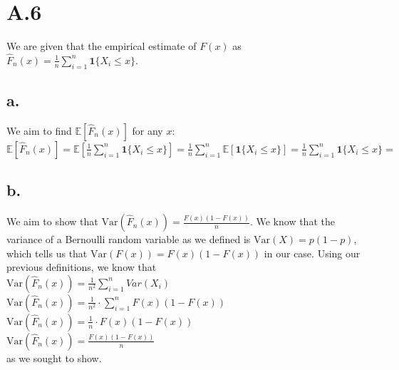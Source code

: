 \documentclass{article}
\newcommand{\1}{\mathbf{1}}
\newcommand{\E}{\mathbb{E}}
\begin{document}
\section*{A.6}
{\Large 

We are given that the empirical estimate of $F(x)$ as $\widehat{F}_n(x) = \frac{1}{n} \sum_{i=1}^n \1\{X_i \leq x\}$.

\subsection*{a.}
We aim to find $\E[ \widehat{F}_n(x) ]$ for any $x$: \\
$\E[ \widehat{F}_n(x) ] = \E[\frac{1}{n} \sum_{i=1}^n \1\{X_i \leq x\}] = \frac{1}{n} \sum_{i=1}^n \E[\1\{X_i \leq x\}] = \frac{1}{n} \sum_{i=1}^n \1\{X_i \leq x\} = $ 

\subsection*{b.}
We aim to show that $\textrm{Var}(\widehat{F}_n(x)) = \frac{F(x)(1-F(x))}{n}$. We know that the variance of a Bernoulli random variable as we defined is $\text{Var}(X) = p(1-p)$, which tells us that $\text{Var}(F(x)) = F(x)(1-F(x))$ in our case. Using our previous definitions, we know that \\
$\textrm{Var}(\widehat{F}_n(x)) = \frac{1}{n^2} \sum_{i = 1}^{n} Var(X_i)$ \\
$\textrm{Var}(\widehat{F}_n(x)) = \frac{1}{n^2} \cdot \sum_{i = 1}^{n} F(x)(1-F(x))$ \\ 
$\textrm{Var}(\widehat{F}_n(x)) = \frac{1}{n} \cdot F(x)(1-F(x))$ \\ 
$\textrm{Var}(\widehat{F}_n(x)) = \frac{F(x)(1-F(x))}{n}$ \\
as we sought to show.

}
\end{document}
